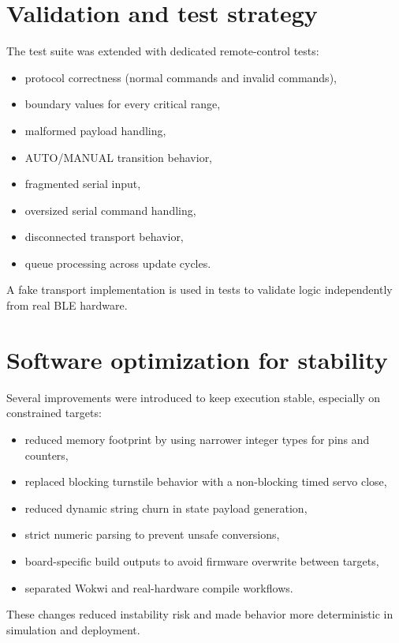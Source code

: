 \section{Validation and test strategy}
The test suite was extended with dedicated remote-control tests:

\begin{itemize}
  \item protocol correctness (normal commands and invalid commands),
  \item boundary values for every critical range,
  \item malformed payload handling,
  \item AUTO/MANUAL transition behavior,
  \item fragmented serial input,
  \item oversized serial command handling,
  \item disconnected transport behavior,
  \item queue processing across update cycles.
\end{itemize}

A fake transport implementation is used in tests to validate logic independently from real BLE hardware.

\section{Software optimization for stability}
Several improvements were introduced to keep execution stable, especially on constrained targets:

\begin{itemize}
  \item reduced memory footprint by using narrower integer types for pins and counters,
  \item replaced blocking turnstile behavior with a non-blocking timed servo close,
  \item reduced dynamic string churn in state payload generation,
  \item strict numeric parsing to prevent unsafe conversions,
  \item board-specific build outputs to avoid firmware overwrite between targets,
  \item separated Wokwi and real-hardware compile workflows.
\end{itemize}

These changes reduced instability risk and made behavior more deterministic in simulation and deployment.

